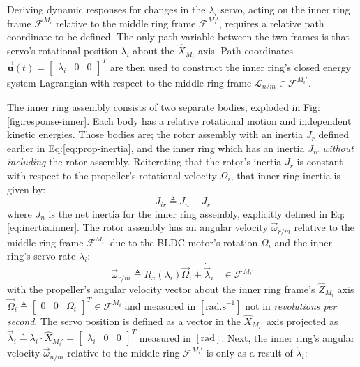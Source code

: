 \par
Deriving dynamic responses for changes in the $\lambda_i$ servo, acting on the inner ring frame $\mathcal{F}^{M_i}$ relative to the middle ring frame $\mathcal{F}^{M_i'}$, requires a relative path coordinate to be defined. The only path variable between the two frames is that servo's rotational position $\lambda_i$ about the $\hat{X}_{M_i}$ axis. Path coordinates $\vec{\mathbf{u}}(t)=\begin{bmatrix}\lambda_i&0&0\end{bmatrix}^T$ are then used to construct the inner ring's closed energy system Lagrangian with respect to the middle ring frame $\mathcal{L}_{n/m}\in\mathcal{F}^{M_i'}$.
\par
The inner ring assembly consists of two separate bodies, exploded in Fig:\ref{fig:response-inner}. Each body has a relative rotational motion and independent kinetic energies. Those bodies are; the rotor assembly with an inertia $J_{r}$ defined earlier in Eq:\ref{eq:prop-inertia}, and the inner ring which has an inertia $J_{ir}$ \emph{without including} the rotor assembly. Reiterating that the rotor's inertia $J_r$ is constant with respect to the propeller's rotational velocity $\Omega_i$, that inner ring inertia is given by:
\begin{equation}
J_{ir}\triangleq J_{n}-J_{r}
\end{equation} 
where $J_n$ is the net inertia for the inner ring assembly, explicitly defined in Eq:\ref{eq:inertia.inner}. The rotor assembly has an angular velocity $\vec{\omega}_{r/m}$ relative to the middle ring frame $\mathcal{F}^{M_i'}$ due to the BLDC motor's rotation $\Omega_i$ and the inner ring's servo rate $\dot{\lambda}_i$:
\begin{equation}\label{eq:angular-rot}
\vec{\omega}_{r/m}\triangleq R_x(\lambda_i)\vec{\Omega}_i+\dot{\vec{\lambda}}_i~~~~\in\mathcal{F}^{M_i'}
\end{equation}
with the propeller's angular velocity vector about the inner ring frame's $\hat{Z}_{M_i}$ axis $\vec{\Omega}_i\triangleq\begin{bmatrix}0 & 0 & \Omega_i\end{bmatrix}^T\in\mathcal{F}^{M_i}$ and measured in $[\text{rad.s}^{-1}]$ not in \emph{revolutions per second}. The servo position is defined as a vector in the $\hat{X}_{M_i'}$ axis projected as $\vec{\lambda}_i\triangleq \lambda_i\cdot\hat{X}_{M_i'}=\begin{bmatrix}\lambda_i & 0 & 0\end{bmatrix}^T$ measured in $[\text{rad}]$. Next, the inner ring's angular velocity $\vec{\omega}_{n/m}$ relative to the middle ring $\mathcal{F}^{M_i'}$ is only as a result of $\dot{\lambda}_i$:
